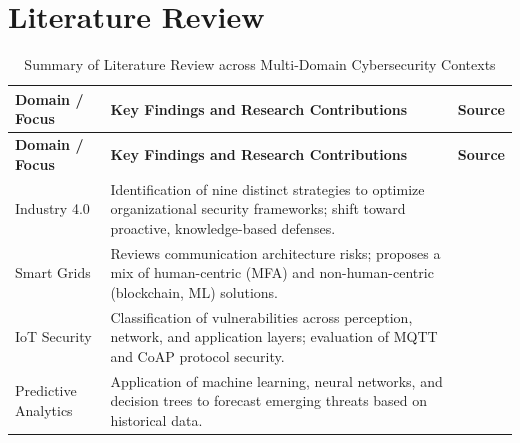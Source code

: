 \documentclass[11pt,a4paper]{article}
\begin{document}
\section{Literature Review}
\vspace{-2em}
\singlespacing
\renewcommand{\arraystretch}{1.5}%
{\fontsize{9}{11}\selectfont 
\begin{longtable}{|p{3.5cm}|p{10cm}|p{1.5cm}|}
    \caption{Summary of Literature Review across Multi-Domain Cybersecurity Contexts} \label{table:lit_review} \\
    
    \hline
    \rowcolor{gray!10} \textbf{Domain / Focus} & \textbf{Key Findings and Research Contributions} & \textbf{Source} \\ \hline
    \endfirsthead

    \hline
    \rowcolor{gray!10} \textbf{Domain / Focus} & \textbf{Key Findings and Research Contributions} & \textbf{Source} \\ \hline
    \endhead

    \hline
    \endfoot

    {\fontsize{11}{13}\selectfont Industry 4.0} & {\fontsize{11}{13}\selectfont Identification of nine distinct strategies to optimize organizational security frameworks; shift toward proactive, knowledge-based defenses.} & \cite{b1} \\ \hline

    {\fontsize{11}{13}\selectfont Smart Grids} & {\fontsize{11}{13}\selectfont Reviews communication architecture risks; proposes a mix of human-centric (MFA) and non-human-centric (blockchain, ML) solutions.} & \cite{b2} \\ \hline

    {\fontsize{11}{13}\selectfont IoT Security} & {\fontsize{11}{13}\selectfont Classification of vulnerabilities across perception, network, and application layers; evaluation of MQTT and CoAP protocol security.} & \cite{b3, b8} \\ \hline

    {\fontsize{11}{13}\selectfont Predictive Analytics} & {\fontsize{11}{13}\selectfont Application of machine learning, neural networks, and decision trees to forecast emerging threats based on historical data.} & \cite{b4} \\ \hline


\end{longtable}}
\end{document}
